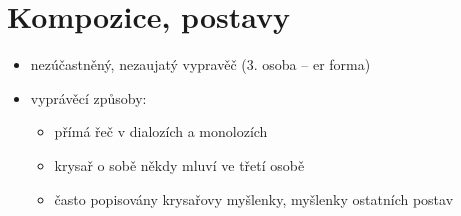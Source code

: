 \documentclass[10pt,a4paper]{article}
\begin{document}
\section*{Kompozice, postavy}
\begin{itemize}
\item nezúčastněný, nezaujatý vypravěč (3. osoba -- er forma)
\item vyprávěcí způsoby:
	\begin{itemize}
	\item přímá řeč v dialozích a monolozích
	\item krysař o sobě někdy mluví ve třetí osobě
	\item často popisovány krysařovy myšlenky, myšlenky ostatních postav 
	\end{itemize}

\end{itemize}
\end{document}
